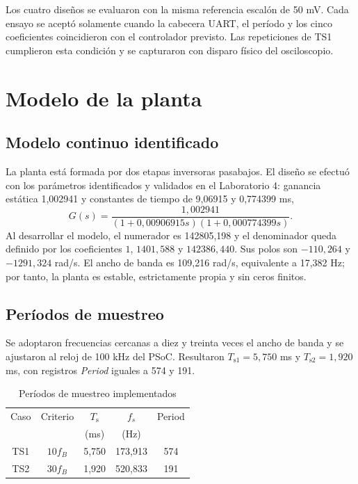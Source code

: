 \documentclass[10pt,twocolumn]{article}
\newcommand{\Ts}{T_{\mathrm{s}}}
\begin{document}
Los cuatro diseños se evaluaron con la misma referencia escalón de 50 mV. Cada ensayo se aceptó solamente cuando la cabecera UART, el período y los cinco coeficientes coincidieron con el controlador previsto. Las repeticiones de TS1 cumplieron esta condición y se capturaron con disparo físico del osciloscopio.

\section{Modelo de la planta}
\subsection{Modelo continuo identificado}
La planta está formada por dos etapas inversoras pasabajos. El diseño se efectuó con los parámetros identificados y validados en el Laboratorio 4: ganancia estática 1,002941 y constantes de tiempo de 9,06915 y 0,774399 ms,
\begin{equation}
G(s)=\frac{1,002941}{(1+0,00906915s)(1+0,000774399s)} .
\end{equation}
Al desarrollar el modelo, el numerador es 142805,198 y el denominador queda definido por los coeficientes \(1\), \(1401,588\) y \(142386,440\). Sus polos son \(-110,264\) y \(-1291,324\) rad/s. El ancho de banda es 109,216 rad/s, equivalente a 17,382 Hz; por tanto, la planta es estable, estrictamente propia y sin ceros finitos.

\subsection{Períodos de muestreo}
Se adoptaron frecuencias cercanas a diez y treinta veces el ancho de banda y se ajustaron al reloj de 100 kHz del PSoC. Resultaron \(T_{\mathrm{s1}}=5,750\) ms y \(T_{\mathrm{s2}}=1,920\) ms, con registros \textit{Period} iguales a 574 y 191.

\begin{table}[!h]
\centering
\caption{Períodos de muestreo implementados}
\begin{tabular}{ccccc}
\toprule
Caso & Criterio & \(\Ts\) & \(f_s\) & Period\\
 & & (ms) & (Hz) & \\
\midrule
TS1 & \(10f_B\) & 5,750 & 173,913 & 574\\
TS2 & \(30f_B\) & 1,920 & 520,833 & 191\\
\bottomrule
\end{tabular}
\end{table}
\end{document}
